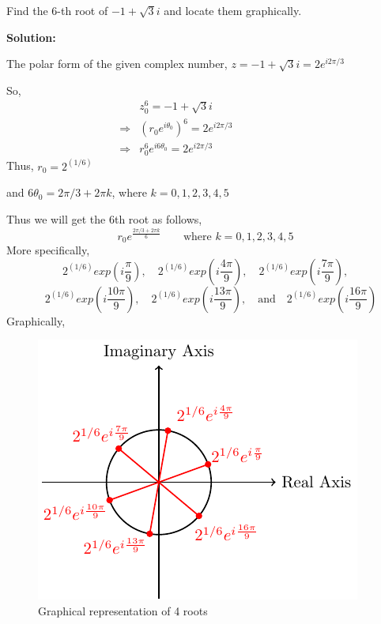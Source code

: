 \begin{ex}
    Find the 6-th root of $-1+\sqrt{3}i$ and locate them graphically. \par 
    \noindent \textbf{Solution:} \par 
    \noindent The polar form of the given complex number, $\displaystyle z=-1+\sqrt{3}i=2e^{i2\pi/3}$\par 
\noindent So, \begin{align*}
    &z_0^6=-1+\sqrt{3}i\hspace{3cm}\\
    \Rightarrow & (r_0e^{i\theta_0})^6=2e^{i2\pi/3}\\
    \Rightarrow & r_0^6e^{i6\theta_0}=2e^{i2\pi/3}
\end{align*}
Thus, $\displaystyle r_0=2^{(1/6)}$ \par 
\noindent and $6\theta_0=2\pi/3+2\pi k$, where $k=0,1,2,3,4,5$\par 
\noindent Thus we will get the 6th root as follows, 
$$r_0e^{\frac{2\pi/3+2\pi k}{6}} \quad \quad \text{where }k=0,1,2,3,4,5$$
More specifically, 
$$2^{(1/6)}exp\left(i\frac{\pi}{9}\right),\quad 2^{(1/6)}exp\left(i\frac{4\pi}{9}\right),\quad 2^{(1/6)}exp\left(i\frac{7\pi}{9}\right),$$
$$\quad 2^{(1/6)}exp\left(i\frac{10\pi}{9}\right), \quad 2^{(1/6)}exp\left(i\frac{13\pi}{9}\right), \quad  \text{and}\quad 2^{(1/6)}exp\left(i\frac{16\pi}{9}\right)$$
Graphically, 
\begin{figure}[!ht]
    \centering
    \includegraphics{FIG_MAT215/FIG8.pdf}
    \caption{Graphical representation of 4 roots}
    \label{fig7}
\end{figure}
\FloatBarrier
\end{ex}
